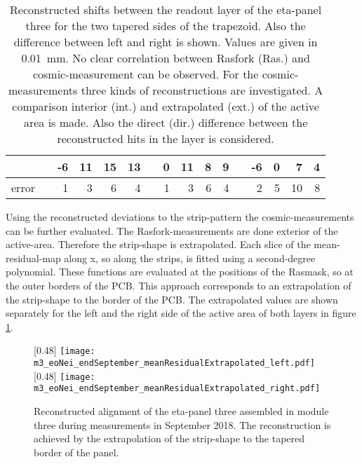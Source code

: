 \documentclass[
twoside,            %
BCOR1.4cm,          %
10pt,               %
headings=normal,    %
headsepline,        %
clearplainpage,		%
final,              %
div=14,
open=right,
bibliography=toc
]{scrreprt}
\begin{document}
\begin{table}[!h]
\begin{tabular}{ccrrrrcrrrrcrrrr}
		\\
		  & &   -6 &   11 &   15 &   13 & &    0 &   11 &    8 &    9 & &   -6 &    0 &    7 &    4
 		\\
	 	\hline
	 	error & & 1 & 3 & 6 & 4 & & 1 & 3 & 6 & 4 & & 2 & 5 & 10 & 8
 		\\
	 	\hline
		\hline
	\end{tabular}
	\caption{
		Reconstructed shifts between the readout layer of the eta-panel three for the two tapered sides of the trapezoid.
		Also the difference between left and right is shown.
		Values are given in \SI{0.01}{mm}.
		No clear correlation between Rasfork (Ras.) and cosmic-measurement can be observed.
		For the cosmic-measurements three kinds of reconstructions are investigated.
		A comparison interior (int.) and extrapolated (ext.) of the active area is made.
		Also the direct (dir.) difference between the reconstructed hits in the layer is considered.
	}
	\label{eta3reconstructedShifts}
\end{table}

Using the reconstructed deviations to the strip-pattern the cosmic-measurements can be further evaluated.
The Rasfork-measurements are done exterior of the active-area.
Therefore the strip-shape is extrapolated.
Each slice of the mean-residual-map along x, so along the strips, is fitted using a second-degree polynomial.
These functions are evaluated at the positions of the Rasmask, so at the outer borders of the PCB.
This approach corresponds to an extrapolation of the strip-shape to the border of the PCB.
The extrapolated values are shown separately for the left and the right side of the active area of both layers in figure \ref{m3alignmentSep}.

\begin{figure}[!h]
	[0.48\textwidth]
	{\texttt{[image: m3\_eoNei\_endSeptember\_meanResidualExtrapolated\_left.pdf]}}
	\hfill
	[0.48\textwidth]
	{\texttt{[image: m3\_eoNei\_endSeptember\_meanResidualExtrapolated\_right.pdf]}}
	\vspace{-2mm}
	\caption{
		Reconstructed alignment of the eta-panel three assembled in module three during measurements in September 2018.
		The reconstruction is achieved by the extrapolation of the strip-shape to the tapered border of the panel.
	}
	\label{m3alignmentSep}
\end{figure}
\end{document}
